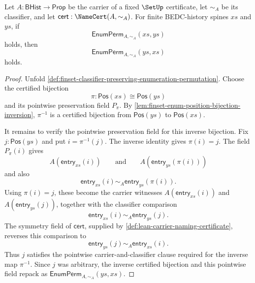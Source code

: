 \begin{theorem}
\label{thm:enumperm-inverse-symmetry}
Let $A:\mathsf{BHist}\to\mathsf{Prop}$ be the carrier of a fixed $\SetUp$ certificate, let $\sim_A$ be its classifier, and let $\mathsf{cert}:\NameCert(A,\sim_A)$. For finite BEDC-history spines $xs$ and $ys$, if
$$
\mathsf{EnumPerm}_{A,\sim_A}(xs,ys)
$$
holds, then
$$
\mathsf{EnumPerm}_{A,\sim_A}(ys,xs)
$$
holds.
\end{theorem}
\begin{proof}
Unfold \autoref{def:finset-classifier-preserving-enumeration-permutation}. Choose the certified bijection
$$
\pi:\mathsf{Pos}(xs)\cong\mathsf{Pos}(ys)
$$
and its pointwise preservation field $P_\pi$. By \autoref{lem:finset-enum-position-bijection-inversion}, $\pi^{-1}$ is a certified bijection from $\mathsf{Pos}(ys)$ to $\mathsf{Pos}(xs)$.

It remains to verify the pointwise preservation field for this inverse bijection. Fix $j:\mathsf{Pos}(ys)$ and put $i=\pi^{-1}(j)$. The inverse identity gives $\pi(i)=j$. The field $P_\pi(i)$ gives
$$
A(\mathsf{entry}_{xs}(i))
\qquad\text{and}\qquad
A(\mathsf{entry}_{ys}(\pi(i)))
$$
and also
$$
\mathsf{entry}_{xs}(i)\sim_A\mathsf{entry}_{ys}(\pi(i)).
$$
Using $\pi(i)=j$, these become the carrier witnesses $A(\mathsf{entry}_{xs}(i))$ and $A(\mathsf{entry}_{ys}(j))$, together with the classifier comparison
$$
\mathsf{entry}_{xs}(i)\sim_A\mathsf{entry}_{ys}(j).
$$
The symmetry field of $\mathsf{cert}$, supplied by \autoref{def:lean-carrier-naming-certificate}, reverses this comparison to
$$
\mathsf{entry}_{ys}(j)\sim_A\mathsf{entry}_{xs}(i).
$$
Thus $j$ satisfies the pointwise carrier-and-classifier clause required for the inverse map $\pi^{-1}$. Since $j$ was arbitrary, the inverse certified bijection and this pointwise field repack as $\mathsf{EnumPerm}_{A,\sim_A}(ys,xs)$.
\end{proof}

